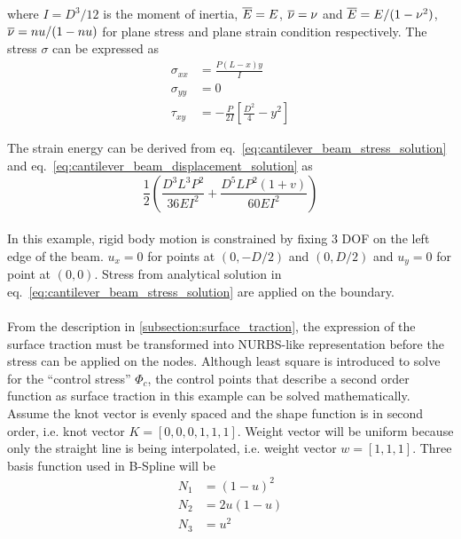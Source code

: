where $I=D^3/12$ is the moment of inertia, $\overline{E}=E$, $\overline{\nu}=\nu$ and $\overline{E}=E/(1-\nu^2)$, $\overline{\nu}=nu/(1-nu)$ for plane
    stress and plane strain condition respectively.
The stress $\sigma$ can be expressed as \cite{Aug2008}
    \begin{subequations}
    \begin{align}
        \sigma_{xx} &= \frac{P(L-x)y}{I} \\
        \sigma_{yy} &= 0 \\
        \tau_{xy} &= -\frac{P}{2I} \left[
            \frac{D^2}{4} - y^2
        \right]
    \end{align}
    \label{eq:cantilever_beam_stress_solution}
    \end{subequations}

The strain energy can be derived from eq.~\ref{eq:cantilever_beam_stress_solution} and eq.~\ref{eq:cantilever_beam_displacement_solution} as
    \begin{equation}
        \frac{1}{2} \left(
            \frac{D^3 L^3 P^2}{36EI^2} + 
            \frac{D^5LP^2(1+v)}{60EI^2}
        \right)
    \label{eq:cantilever_beam_energy_solution}
    \end{equation}

\paragraph{}
In this example, rigid body motion is constrained by fixing 3 DOF on the left edge of the beam.
$u_x=0$ for points at $(0,-D/2)$ and $(0,D/2)$ and $u_y =0$ for point at $(0,0)$.
Stress from analytical solution in eq.~\ref{eq:cantilever_beam_stress_solution} are applied on the boundary.

\paragraph{}
From the description in \ref{subsection:surface_traction}, the expression of the surface traction must be transformed into
    NURBS-like representation before the stress can be applied on the nodes.
Although least square is introduced to solve for the ``control stress'' $\Phi_c$, the control points that describe a second
    order function as surface traction in this example can be solved mathematically.
Assume the knot vector is evenly spaced and the shape function is in second order, i.e. knot vector $K=[0,0,0,1,1,1]$.
Weight vector will be uniform because only the straight line is being interpolated, i.e. weight vector $w=[1,1,1]$.
Three basis function used in B-Spline will be
    \begin{equation}
    \begin{aligned}
        N_1 & = (1-u)^2 \\
        N_2 & = 2u(1-u) \\
        N_3 & = u^2
    \end{aligned}
    \end{equation}

